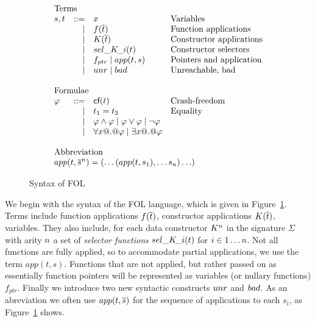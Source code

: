 \begin{figure}
\[\begin{array}{c} 
\begin{array}{lrll}
\multicolumn{3}{l}{\text{Terms}} \\
  s,t & ::=  & x                          & \text{Variables} \\ 
      & \mid & f(\ol{t})                  & \text{Function applications} \\
      & \mid & K(\ol{t})                  & \text{Constructor applications} \\ 
      & \mid & \sel{K}{i}(t)              & \text{Constructor selectors} \\ 
      & \mid & f_{ptr} \mid app(t,s)       & \text{Pointers and application} \\
      & \mid & \unr \mid \bad             & \text{Unreachable, bad} \\ \\
\multicolumn{3}{l}{\text{Formulae}} \\ 
 \phi & ::=  & \lcf{t}    & \text{Crash-freedom} \\
      & \mid & t_1 = t_2  & \text{Equality} \\ 
      & \mid & \phi \land \phi \mid \phi \lor \phi \mid \neg \phi \\
      & \mid & \forall x @.@ \phi \mid \exists x @.@ \phi \\ \\ 
\multicolumn{3}{l}{\text{Abbreviation}} \\ 
\multicolumn{4}{l}{app(t,\oln{s}{n}) = (\ldots(app(t,s_1),\ldots s_n)\ldots)}
\end{array}
\end{array}\]
\caption{Syntax of FOL}\label{fig:fol-image}
\end{figure}

We begin with the syntax of the FOL language, which
is given in Figure~\ref{fig:fol-image}. Terms include function 
applications $f(\overline{t})$, constructor applications $K(\overline{t})$, variables. They 
also include, for each data constructor $K^n$ in the signature $\Sigma$ with 
arity $n$ a set of {\em selector functions} $\mathop{sel\_K\!\_i}(t)$ for $i \in 1 \ldots n$.
Not all functions are fully applied, so to accommodate partial applications, we use 
the term $app(t,s)$. Functions that are not applied, but rather passed on as essentially 
function pointers will be represented as variables (or nullary functions) $f_{ptr}$. Finally 
we introduce two new syntactic constructs $\mathop{unr}$ and $\mathop{bad}$. As an abreviation we often use
$app(t,\overline{s})$ for the sequence of applications to each $s_i$, as 
Figure~\ref{fig:fol-image} shows.

